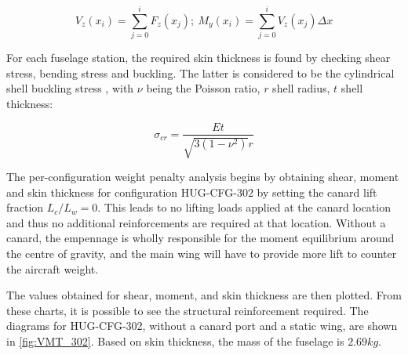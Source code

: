 \begin{equation}
    V_z(x_i) = \sum_{j=0}^{i} F_z(x_j);\ M_y(x_i) = \sum_{j=0}^{i} V_z(x_j)\Delta x
\end{equation}

For each fuselage station, the required skin thickness is found by checking shear stress, bending stress and buckling. The latter is considered to be the cylindrical shell buckling stress \cite{NASA_SP8007_1968}, with $\nu$ being the Poisson ratio, $r$ shell radius, $t$ shell thickness:

\begin{equation}
    \sigma_{cr}
    =
    \frac{E t}{\sqrt{3(1-\nu^2)}r}
\end{equation}






The per-configuration weight penalty analysis begins by obtaining shear, moment and skin thickness for configuration HUG-CFG-302 by setting the canard lift fraction $L_c / L_w = 0$. This leads to no lifting loads applied at the canard location and thus no additional reinforcements are required at that location. Without a canard, the empennage is wholly responsible for the moment equilibrium around the centre of gravity, and the main wing will have to provide more lift to counter the aircraft weight.

The values obtained for shear, moment, and skin thickness are then plotted. From these charts, it is possible to see the structural reinforcement required. The diagrams for HUG-CFG-302, without a canard port and a static wing, are shown in \autoref{fig:VMT_302}. Based on skin thickness, the mass of the fuselage is $2.69kg$.


